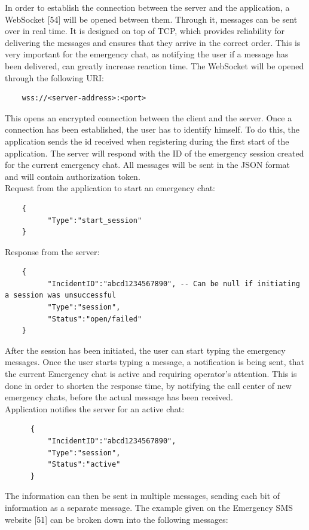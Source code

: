 \documentclass{article}
\begin{document}
In order to establish the connection between the server and the application, a WebSocket [54] will be opened between them. Through it, messages can be sent over in real time. It is designed on top of TCP, which provides reliability for delivering the messages and ensures that they arrive in the correct order. This is very important for the emergency chat, as notifying the user if a message has been delivered, can greatly increase reaction time. The WebSocket will be opened through the following URI:
\begin{lstlisting}
	wss://<server-address>:<port>
\end{lstlisting}
This opens an encrypted connection between the client and the server. Once a connection has been established, the user has to identify himself. To do this, the application sends the id received when registering during the first start of the application. The server will respond with the ID of the emergency session created for the current emergency chat. All messages will be sent in the JSON format and will contain authorization token.\\

Request from the application to start an emergency chat:
\begin{lstlisting}
	{
          "Type":"start_session"
	}
\end{lstlisting}

Response from the server:
\begin{lstlisting}
	{
          "IncidentID":"abcd1234567890", -- Can be null if initiating a session was unsuccessful
          "Type":"session",
          "Status":"open/failed"
	}
\end{lstlisting}
After the session has been initiated, the user can start typing the emergency messages. Once the user starts typing a message, a notification is being sent, that the current Emergency chat is active and requiring operator’s attention. This is done in order to shorten the response time, by notifying the call center of new emergency chats, before the actual message has been received.\\

\pagebreak
Application notifies the server for an active chat:
\begin{lstlisting}
      {
          "IncidentID":"abcd1234567890",
          "Type":"session",
          "Status":"active"
      }
\end{lstlisting}

The information can then be sent in multiple messages, sending each bit of information as a separate message. The example given on the Emergency SMS website [51] can be broken down into the following messages:\\
\end{document}
